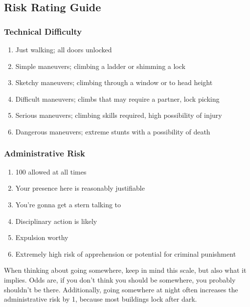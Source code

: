 \documentclass{article}
\begin{document}
  \subsection{Risk Rating Guide}
  \begin{multicols}{2}
    
  \subsubsection*{Technical Difficulty}
  \begin{enumerate}
    \item [(1)] Just walking; all doors unlocked
    \item [(2)] Simple maneuvers; climbing a ladder or shimming a lock
    \item [(3)] Sketchy maneuvers; climbing through a window or to head height
    \item [(4)] Difficult maneuvers; climbs that may require a partner, lock picking
    \item [(5)] Serious maneuvers; climbing skills required, high possibility of injury
    \item [(6)] Dangerous maneuvers; extreme stunts with a possibility of death

  \end{enumerate}
  \subsubsection*{Administrative Risk}
  \begin{enumerate}
    \item [(A)] 100 allowed at all times
    \item [(B)] Your presence here is reasonably justifiable
    \item [(C)] You’re gonna get a stern talking to
    \item [(D)] Disciplinary action is likely
    \item [(E)] Expulsion worthy
    \item [(F)] Extremely high risk of apprehension or potential for criminal punishment
  \end{enumerate}
  \end{multicols}
  

  When thinking about going somewhere, keep in mind this scale, but also what it implies. Odds are, if you don't think you should be somewhere, you probably shouldn't be there. Additionally, going somewhere at night often increases the administrative risk by 1, because most buildings lock after dark.
  
\end{document}
